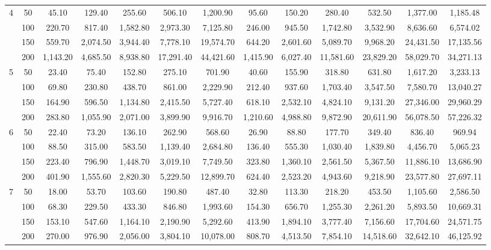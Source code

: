 \begin{table}[htbp]
\begin{adjustbox}{angle=90}
{\begin{tabular}{|c|c|c|c|c|c|c|c|c|c|c|c|c|}
    4 & 50 & 45.10 & 129.40 & 255.60 & 506.10 & 1,200.90 & 95.60 & 150.20 & 280.40 & 532.50 & 1,377.00 & 1,185.48 \\
     & 100 & 220.70 & 817.40 & 1,582.80 & 2,973.30 & 7,125.80 & 246.00 & 945.50 & 1,742.80 & 3,532.90 & 8,636.60 & 6,574.02 \\
     & 150 & 559.70 & 2,074.50 & 3,944.40 & 7,778.10 & 19,574.70 & 644.20 & 2,601.60 & 5,089.70 & 9,968.20 & 24,431.50 & 17,135.56 \\
     & 200 & 1,143.20 & 4,685.50 & 8,938.80 & 17,291.40 & 44,421.60 & 1,415.90 & 6,027.40 & 11,581.60 & 23,829.20 & 58,029.70 & 34,271.13 \\ \hline
    5 & 50 & 23.40 & 75.40 & 152.80 & 275.10 & 701.90 & 40.60 & 155.90 & 318.80 & 631.80 & 1,617.20 & 3,233.13 \\
     & 100 & 69.80 & 230.80 & 438.70 & 861.00 & 2,229.90 & 212.40 & 937.60 & 1,703.40 & 3,547.50 & 7,580.70 & 13,040.27 \\
     & 150 & 164.90 & 596.50 & 1,134.80 & 2,415.50 & 5,727.40 & 618.10 & 2,532.10 & 4,824.10 & 9,131.20 & 27,346.00 & 29,960.29 \\
     & 200 & 283.80 & 1,055.90 & 2,071.00 & 3,899.90 & 9,916.70 & 1,210.60 & 4,988.80 & 9,872.90 & 20,611.90 & 56,078.50 & 57,226.32 \\ \hline
    6 & 50 & 22.40 & 73.20 & 136.10 & 262.90 & 568.60 & 26.90 & 88.80 & 177.70 & 349.40 & 836.40 & 969.94 \\
     & 100 & 88.50 & 315.00 & 583.50 & 1,139.40 & 2,684.80 & 136.40 & 555.30 & 1,030.40 & 1,839.80 & 4,456.70 & 5,065.23 \\
     & 150 & 223.40 & 796.90 & 1,448.70 & 3,019.10 & 7,749.50 & 323.80 & 1,360.10 & 2,561.50 & 5,367.50 & 11,886.10 & 13,686.90 \\
     & 200 & 401.90 & 1,555.60 & 2,820.30 & 5,229.50 & 12,899.70 & 624.40 & 2,523.20 & 4,943.60 & 9,218.90 & 23,577.80 & 27,697.11 \\ \hline
    7 & 50 & 18.00 & 53.70 & 103.60 & 190.80 & 487.40 & 32.80 & 113.30 & 218.20 & 453.50 & 1,105.60 & 2,586.50 \\
     & 100 & 68.30 & 229.50 & 433.30 & 846.80 & 1,993.60 & 154.30 & 656.70 & 1,255.30 & 2,261.20 & 5,893.50 & 10,669.31 \\
     & 150 & 153.10 & 547.60 & 1,164.10 & 2,190.90 & 5,292.60 & 413.90 & 1,894.10 & 3,777.40 & 7,156.60 & 17,704.60 & 24,571.75 \\
     & 200 & 270.00 & 976.90 & 2,056.00 & 3,804.10 & 10,078.00 & 808.70 & 4,513.50 & 7,854.10 & 14,518.60 & 32,642.10 & 46,125.92 \\ \hline

\end{tabular}}
\end{adjustbox}
\end{table}
